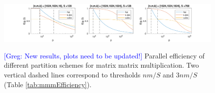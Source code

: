 \documentclass[sigplan,review,anonymous]{acmart}\settopmatter{printfolios=true,printccs=false,printacmref=false}
\newcommand\greg[1]{\textcolor{blue}{[Greg: #1]}}
\begin{document}


 \begin{figure}[t]
 	\hspace*{-1.5cm}
 	\includegraphics[width=2.5\columnwidth]{figures/mmmScaling}
 	\label{fig:mmmScaling}
 	\caption{\greg{New results, plots need to be updated!} Parallel efficiency 
 	of different partition schemes for matrix 
 		matrix multiplication. Two vertical dashed lines correspond to 
 		thresholds 
 		$nm/S$ and $3nm/S$ (Table \ref{tab:mmmEfficiency}).}
 \end{figure}
 
\end{document}
